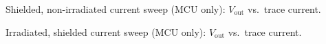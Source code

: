 \documentclass[12pt,a4paper]{article}
\begin{document}
\begin{table}[H]
    \centering
    
    \begin{minipage}[t]{0.48\textwidth}
        \caption{Shielded, non-irradiated current sweep (MCU only): $V_{\text{out}}$ vs.\ trace current.}
        \label{tab:sensitivity-shielded}
    \end{minipage}\hfill
    \begin{minipage}[t]{0.48\textwidth}
        \caption{Irradiated, shielded current sweep (MCU only): $V_{\text{out}}$ vs.\ trace current.}
        \label{tab:sensitivity-irr-shielded}
    \end{minipage}
    
    \vspace{0.3cm} %
    

\end{table}
\end{document}
